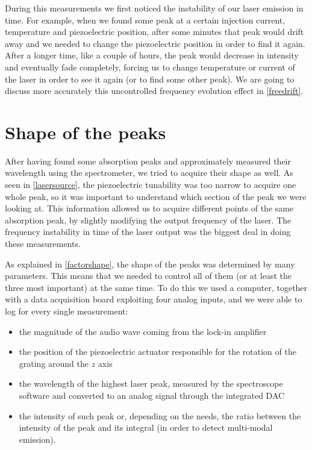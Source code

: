 During this measurements we first noticed the instability of our laser emission in time. For example, when we found some peak at a certain injection current, temperature and piezoelectric position, after some minutes that peak would drift away and we needed to change the piezoelectric position in order to find it again. After a longer time, like a couple of hours, the peak would decrease in intensity and eventually fade completely, forcing us to change temperature or current of the laser
in order to see it again (or to find some other peak). We are going to discuss more accurately this uncontrolled frequency evolution effect in \cref{freedrift}. 

\section{Shape of the peaks}\label{shapeaks}
\label{factorsinfluencingtheshapeofthepeaks}
After having found some absorption peaks and approximately measured their wavelength using the spectrometer, we tried to acquire their shape as well. As seen in \cref{lasersource}, the piezoelectric tunability was too narrow to acquire one whole peak, so it was important to understand which section of the peak we were looking at. This information allowed us to acquire different points of the same absorption peak, by slightly modifying the output frequency of the laser. The frequency instability in time of the laser output was the biggest deal in doing these measurements. 

As explained in \cref{factorshape}, the shape of the peaks was determined by many parameters. This means that we needed to control all of them (or at least the three most important) at the same time. To do this we used a computer, together with a data acquisition board exploiting four analog inputs, and we were able to log for every single measurement:
\begin{itemize}
	\item the magnitude of the audio wave coming from the lock-in amplifier
	\item the position of the piezoelectric actuator responsible for the rotation of the grating around the $z$ axis
	\item the wavelength of the highest laser peak, measured by the spectroscope software and converted to an analog signal through the integrated DAC
	\item the intensity of such peak or, depending on the needs, the ratio between the intensity of the peak and its integral (in order to detect multi-modal emission).
\end{itemize}

